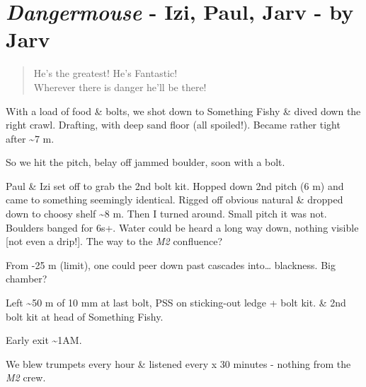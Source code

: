 \section{\texorpdfstring{\emph{Dangermouse} - Izi, Paul, Jarv - by
Jarv}{Dangermouse - Izi, Paul, Jarv - by Jarv}}

\begin{verse}
He's the greatest! He's Fantastic!\\
Wherever there is danger he'll be there!
\end{verse}

With a load of food \& bolts, we shot down to Something Fishy \& dived
down the right crawl. Drafting, with deep sand floor (all spoiled!).
Became rather tight after \textasciitilde7 m.

So we hit the pitch, belay off jammed boulder, soon with a bolt.

Paul \& Izi set off to grab the 2nd bolt kit. Hopped down 2nd pitch (6
m) and came to something seemingly identical. Rigged off obvious natural
\& dropped down to choosy shelf \textasciitilde8 m. Then I turned
around. Small pitch it was not. Boulders banged for 6s+. Water could be
heard a long way down, nothing visible {[}not even a drip!{]}. The way
to the \emph{M2} confluence?

From -25 m (limit), one could peer down past cascades into\ldots{}
blackness. Big chamber?

Left \textasciitilde50 m of 10 mm at last bolt, PSS on sticking-out
ledge + bolt kit. \& 2nd bolt kit at head of Something Fishy.

Early exit \textasciitilde1AM.

We blew trumpets every hour \& listened every x 30 minutes - nothing
from the \emph{M2} crew.

